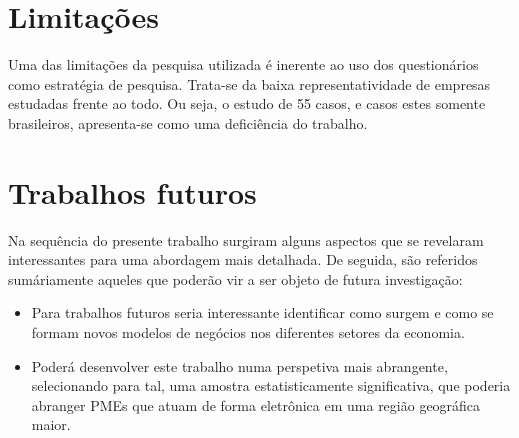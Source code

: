 \section{Limitações}
\label{sec:model}

Uma das limitações da pesquisa utilizada é inerente ao uso dos questionários como estratégia de pesquisa. Trata-se da baixa representatividade de empresas estudadas frente ao todo. Ou seja, o estudo de 55 casos, e casos estes somente brasileiros, apresenta-se como uma deficiência do trabalho.

\section{Trabalhos futuros}
\label{sec:model}

Na sequência do presente trabalho surgiram alguns aspectos que se revelaram interessantes para uma abordagem mais detalhada. De seguida, são referidos sumáriamente aqueles que poderão vir a ser objeto de futura investigação:
\begin{itemize}
\item Para trabalhos futuros seria interessante identificar como surgem e como se formam novos modelos de negócios nos diferentes setores da economia. 
\item Poderá desenvolver este trabalho numa perspetiva mais abrangente, selecionando para tal, uma amostra estatisticamente significativa, que poderia abranger PMEs que atuam de forma eletrônica em uma região geográfica maior.
\end{itemize}
